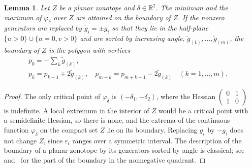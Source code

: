 \documentclass[10pt]{article}
\newtheorem{lemma}{Lemma}
\theoremstyle{definition}
\newcommand{\R}{\mathbb{R}}
\newcommand{\eps}{\varepsilon}
\begin{document}
\begin{lemma}
\label{lem:zonotope}
Let $Z$ be a planar zonotope and $\delta\in\R^2$. The minimum and the maximum of $\varphi_\delta$ over $Z$ are attained on the boundary of $Z$. If the nonzero generators are replaced by $\tilde g_i=\pm g_i$ so that they lie in the half-plane $\{u>0\}\cup\{u=0,v>0\}$ and are sorted by increasing angle, $\tilde g_{(1)},\dots,\tilde g_{(m)}$, the boundary of $Z$ is the polygon with vertices
\begin{equation}
\label{eq:boundary}
\begin{gathered}p_0=-\sum_k\tilde g_{(k)},\\ p_k = p_{k-1}+2\tilde g_{(k)},\quad p_{m+k} = p_{m+k-1}-2\tilde g_{(k)}\quad (k=1,\dots,m).\end{gathered}
\end{equation}
\end{lemma}
\begin{proof}
The only critical point of $\varphi_\delta$ is $(-\delta_1,-\delta_2)$, where the Hessian $\left(\begin{smallmatrix}0&1\\1&0\end{smallmatrix}\right)$ is indefinite. A local extremum in the interior of $Z$ would be a critical point with a semidefinite Hessian, so there is none, and the extrema of the continuous function $\varphi_\delta$ on the compact set $Z$ lie on its boundary. Replacing $g_i$ by $-g_i$ does not change $Z$, since $\eps_i$ ranges over a symmetric interval. The description of the boundary of a planar zonotope by its generators sorted by angle is classical; see~\cite{ziegler1995lectures} and~\cite[Prop.~7]{skalna2017new} for the part of the boundary in the nonnegative quadrant.
\end{proof}
\end{document}
